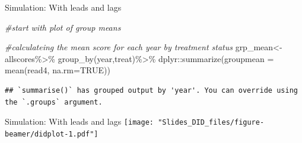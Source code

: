 \documentclass[
  ignorenonframetext,
]{beamer}
\newenvironment{Shaded}{\begin{snugshade}}{\end{snugshade}}
\newcommand{\AttributeTok}[1]{\textcolor[rgb]{0.77,0.63,0.00}{#1}}
\newcommand{\CommentTok}[1]{\textcolor[rgb]{0.56,0.35,0.01}{\textit{#1}}}
\newcommand{\ConstantTok}[1]{\textcolor[rgb]{0.00,0.00,0.00}{#1}}
\newcommand{\DecValTok}[1]{\textcolor[rgb]{0.00,0.00,0.81}{#1}}
\newcommand{\FunctionTok}[1]{\textcolor[rgb]{0.00,0.00,0.00}{#1}}
\newcommand{\NormalTok}[1]{#1}
\newcommand{\OtherTok}[1]{\textcolor[rgb]{0.56,0.35,0.01}{#1}}
\newcommand{\SpecialCharTok}[1]{\textcolor[rgb]{0.00,0.00,0.00}{#1}}
\newcommand{\StringTok}[1]{\textcolor[rgb]{0.31,0.60,0.02}{#1}}
\begin{document}
\begin{frame}[fragile]{Simulation: With leads and lags}
\protect\hypertarget{simulation-with-leads-and-lags-4}{}
\tiny

\begin{Shaded}
\begin{Highlighting}[]
\CommentTok{\#start with plot of group means}

\CommentTok{\#calculateing the mean score for each year by treatment status}
\NormalTok{grp\_mean}\OtherTok{\textless{}{-}}\NormalTok{allscores}\SpecialCharTok{\%\textgreater{}\%}
    \FunctionTok{group\_by}\NormalTok{(year,treat)}\SpecialCharTok{\%\textgreater{}\%}
\NormalTok{    dplyr}\SpecialCharTok{::}\FunctionTok{summarize}\NormalTok{(}\AttributeTok{groupmean =} \FunctionTok{mean}\NormalTok{(read4, }\AttributeTok{na.rm=}\ConstantTok{TRUE}\NormalTok{))}
\end{Highlighting}
\end{Shaded}

\begin{verbatim}
## `summarise()` has grouped output by 'year'. You can override using the `.groups` argument.
\end{verbatim}

\begin{Shaded}
\end{Shaded}
\end{frame}

\begin{frame}{Simulation: With leads and lags}
\protect\hypertarget{simulation-with-leads-and-lags-5}{}
\texttt{[image: "Slides\_DID\_files/figure-beamer/didplot-1.pdf"]}
\end{frame}
\end{document}
